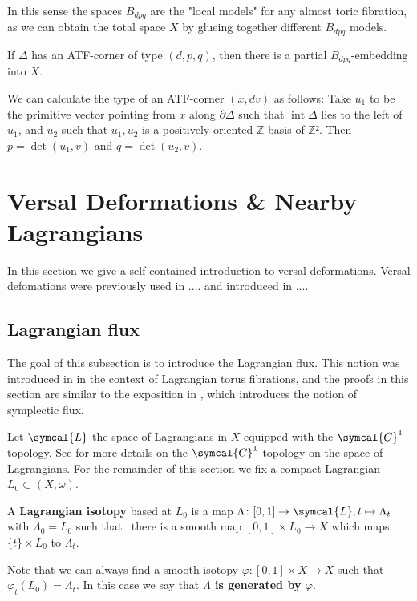 \documentclass[12pt,a4paper,abstract=true,draft]{scrartcl}
\DeclareMathOperator{\interior}{int}
\begin{document}
In this sense the spaces $B_{dpq}$ are the "local models" for any almost toric fibration, as we can obtain the total space $X$ by glueing together different $B_{dpq}$ models.

\begin{lemma}
  \label{thm:atf_bdpq}
  If $Δ$ has an ATF-corner of type $(d,p,q)$, then there is a partial $B_{dpq}$-embedding into $X$.
\end{lemma}

\begin{remark}
  \label{rem:atf_corner_type_calc}
  We can calculate the type of an ATF-corner $(x,dv)$ as follows: Take $u_1$ to be the primitive vector pointing from $x$ along $∂Δ$ such that $\interior{Δ}$ lies to the left of $u_1$, and $u_2$ such that $u_1,u_2$ is a positively oriented $ℤ$-basis of $ℤ²$.
Then $p=\det(u_1,v)$ and $q = \det(u_2,v)$.
\end{remark}

\section{Versal Deformations \& Nearby Lagrangians}
\label{sec:vds}

In this section we give a self contained introduction to versal deformations.
Versal defomations were previously used in .... and introduced in .... 

\subsection{Lagrangian flux}
\label{sec:lagflux}

The goal of this subsection is to introduce the Lagrangian flux.
This notion was introduced in \cite[Section 2.4]{evans2021atfs} in the context of Lagrangian torus fibrations, and the proofs in this section are similar to the exposition in \cite[Section 10.2]{McDuffSalamonSympTop}, which introduces the notion of symplectic flux.

Let $\symcal{L}$ the space of Lagrangians in $X$ equipped with the $\symcal{C}^1$-topology.
See \cite{ono2008LagrangianFlux} for more details on the $\symcal{C}^1$-topology on the space of Lagrangians. 
For the remainder of this section we fix a compact Lagrangian $L_0 ⊂ (X,ω)$.

\begin{definition}
  A \textbf{Lagrangian isotopy} based at $L_0$ is a map $\Lambda \colon [0,1] \rightarrow \symcal{L}, t \mapsto \Lambda_t$ with $\Lambda_0 = L_0$ such that \ there is a smooth map $[0,1] \times L_0 \rightarrow X$ which maps $\{t\} \times L_0$ to $\Lambda_t$.

  Note that we can always find a smooth isotopy $φ \colon [0,1] × X → X$ such that\ $φ_t(L_0) = Λ_t$.
  In this case we say that \textbf{$Λ$ is generated by $φ$}.
\end{definition}
\end{document}
